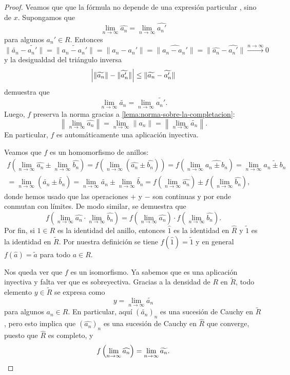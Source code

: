 \documentclass{article}
\numberwithin{equation}{section}
\theoremstyle{definition}
\begin{document}
\begin{lema}
\begin{proof}
    Veamos que que la fórmula 
    no depende de una expresión particular
    , sino de $x$. Supongamos que
    $$\lim_{n\to\infty} \widehat{a_n} = \lim_{n\to\infty} \widehat{a_n'}$$
    para algunos $a_n'\in R$. Entonces
    \[ \|\widetilde{a_n} - \widetilde{a_n'}\| =
       \|\widetilde{a_n - a_n'}\| =
       \|a_n - a_n'\| =
       \|\widehat{a_n - a_n'}\| =
       \|\widehat{a_n} - \widehat{a_n'}\|
       \xrightarrow{n\to\infty} 0 \]
    y la desigualdad del triángulo inversa
    \[ \Bigl| \|\widetilde{a_n}\| - \|\widetilde{a_n'}\|\Bigr| \le
       \|\widetilde{a_n} - \widetilde{a_n'}\| \]
    demuestra que
    $$\lim_{n\to\infty} \widetilde{a_n} = \lim_{n\to\infty} \widetilde{a_n'}.$$
    Luego, $f$ preserva la norma gracias a
    \ref{lema:norma-sobre-la-completacion}:
    \[ \left\|\lim_{n\to\infty} \widehat{a_n}\right\| =
       \lim_{n\to\infty} \|a_n\| =
       \left\|\lim_{n\to\infty} \widetilde{a_n}\right\|. \]
    En particular, $f$ es automáticamente una aplicación inyectiva.

    Veamos que $f$ es un homomorfismo de anillos:
    \begin{align*}
      f \left(\lim_{n\to\infty} \widehat{a_n} \pm \lim_{n\to\infty} \widehat{b_n}\right) =
      f\left(\lim_{n\to\infty} (\widehat{a_n}\pm\widehat{b_n})\right) =
      f\left(\lim_{n\to\infty} \widehat{a_n\pm b_n}\right) =
      \lim_{n\to\infty} \widetilde{a_n\pm b_n} \\
      = \lim_{n\to\infty} (\widetilde{a_n}\pm \widetilde{b_n}) =
      \lim_{n\to\infty} \widetilde{a_n}\pm \lim_{n\to\infty} \widetilde{b_n} =
      f \left(\lim_{n\to\infty} \widehat{a_n}\right) \pm f \left(\lim_{n\to\infty} \widehat{b_n}\right),
    \end{align*}
    donde hemos usado que las operaciones $+$ y $-$ son continuas y por ende
    conmutan con límites. De modo similar, se demuestra que
    \[ f \left(\lim_{n\to\infty} \widehat{a_n}\cdot\lim_{n\to\infty} \widehat{b_n}\right) =
       f \left(\lim_{n\to\infty} \widehat{a_n}\right)\cdot f \left(\lim_{n\to\infty} \widehat{b_n}\right). \]
    Por fin, si $1\in R$ es la identidad del anillo, entonces $\widehat{1}$ es
    la identidad en $\widehat{R}$ y $\widetilde{1}$ es la identidad en
    $\widetilde{R}$. Por nuestra definición se tiene
    $f (\widehat{1}) = \widetilde{1}$ y en general
    $f (\widehat{a}) = \widetilde{a}$ para todo $a\in R$.

    Nos queda ver que $f$ es un isomorfismo. Ya sabemos que es una aplicación
    inyectiva y falta ver que es sobreyectiva. Gracias a la densidad de $R$ en
    $\widetilde{R}$, todo elemento $y\in \widetilde{R}$ se expresa como
    $$y = \lim_{n\to\infty} \widetilde{a_n}$$
    para algunos $a_n \in R$. En particular, aquí $(\widetilde{a_n})_n$
    es una sucesión de Cauchy en $\widetilde{R}$, pero esto implica que
    $(\widehat{a_n})_n$ es una sucesión de Cauchy en $\widehat{R}$ que converge,
    puesto que $\widehat{R}$ es completo, y
    \[ f \left(\lim_{n\to\infty} \widehat{a_n}\right) =
       \lim_{n\to\infty} \widetilde{a_n}. \qedhere \]
  \end{proof}
\end{lema}
\end{document}
